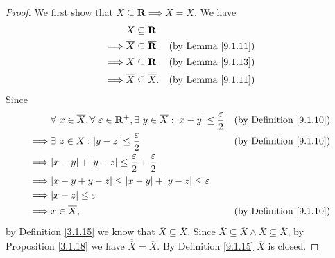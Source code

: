 \begin{proof}
    We first show that \(X \subseteq \mathbf{R} \implies \overline{\overline{X}} = \overline{X}\).
    We have
    \begin{align*}
                 & X \subseteq \mathbf{R}                                                           \\
        \implies & \overline{X} \subseteq \overline{\mathbf{R}}    & \text{(by Lemma \ref{9.1.11})} \\
        \implies & \overline{X} \subseteq \mathbf{R}               & \text{(by Lemma \ref{9.1.13})} \\
        \implies & \overline{X} \subseteq \overline{\overline{X}}. & \text{(by Lemma \ref{9.1.11})}
    \end{align*}
    Since
    \begin{align*}
                 & \forall\ x \in \overline{\overline{X}}, \forall\ \varepsilon \in \mathbf{R}^+, \exists\ y \in \overline{X} : \abs*{x - y} \leq \frac{\varepsilon}{2} & \text{(by Definition \ref{9.1.10})} \\
        \implies & \exists\ z \in X : \abs*{y - z} \leq \frac{\varepsilon}{2}                                                                                           & \text{(by Definition \ref{9.1.10})} \\
        \implies & \abs*{x - y} + \abs*{y - z} \leq \frac{\varepsilon}{2} + \frac{\varepsilon}{2}                                                                                                             \\
        \implies & \abs*{x - y + y - z} \leq \abs*{x - y} + \abs*{y - z} \leq \varepsilon                                                                                                                     \\
        \implies & \abs*{x - z} \leq \varepsilon                                                                                                                                                              \\
        \implies & x \in \overline{X},                                                                                                                                  & \text{(by Definition \ref{9.1.10})}
    \end{align*}
    by Definition \ref{3.1.15} we know that \(\overline{\overline{X}} \subseteq \overline{X}\).
    Since \(\overline{\overline{X}} \subseteq \overline{X} \land \overline{X} \subseteq \overline{\overline{X}}\), by Proposition \ref{3.1.18} we have \(\overline{\overline{X}} = \overline{X}\).
    By Definition \ref{9.1.15} \(\overline{X}\) is closed.


\end{proof}
